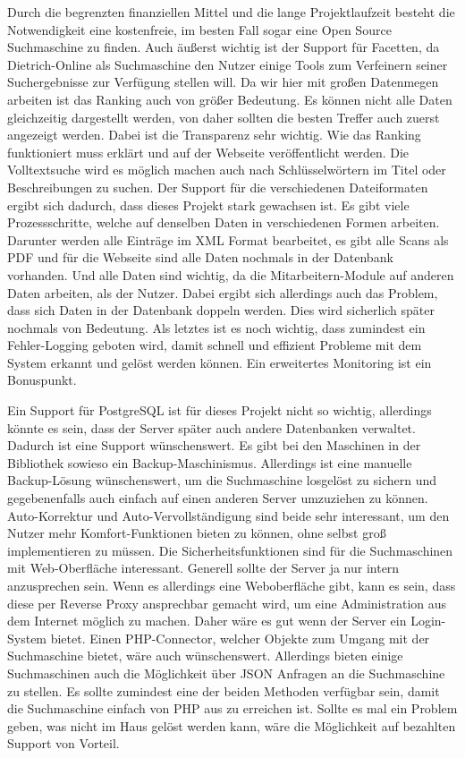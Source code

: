 Durch die begrenzten finanziellen Mittel und die lange Projektlaufzeit besteht die Notwendigkeit eine kostenfreie, im besten Fall sogar eine Open Source Suchmaschine zu finden. Auch äußerst wichtig ist der Support für Facetten, da Dietrich-Online als Suchmaschine den Nutzer einige Tools zum Verfeinern seiner Suchergebnisse zur Verfügung stellen will.
Da wir hier mit großen Datenmegen arbeiten ist das Ranking auch von größer Bedeutung. Es können nicht alle Daten gleichzeitig dargestellt werden, von daher sollten die besten Treffer auch zuerst angezeigt werden. Dabei ist die Transparenz sehr wichtig. Wie das Ranking funktioniert muss erklärt und auf der Webseite veröffentlicht werden.
Die Volltextsuche wird es möglich machen auch nach Schlüsselwörtern im Titel oder Beschreibungen zu suchen.
Der Support für die verschiedenen Dateiformaten ergibt sich dadurch, dass dieses Projekt stark gewachsen ist. Es gibt viele Prozessschritte, welche auf denselben Daten in verschiedenen Formen arbeiten. Darunter werden alle Einträge im XML Format bearbeitet, es gibt alle Scans als PDF und für die Webseite sind alle Daten nochmals in der Datenbank vorhanden. Und alle Daten sind wichtig, da die Mitarbeitern-Module auf anderen Daten arbeiten, als der Nutzer. Dabei ergibt sich allerdings auch das Problem, dass sich Daten in der Datenbank doppeln werden. Dies wird sicherlich später nochmals von Bedeutung.
Als letztes ist es noch wichtig, dass zumindest ein Fehler-Logging geboten wird, damit schnell und effizient Probleme mit dem System erkannt und gelöst werden können. Ein erweitertes Monitoring ist ein Bonuspunkt.

Ein Support für PostgreSQL ist für dieses Projekt nicht so wichtig, allerdings könnte es sein, dass der Server später auch andere Datenbanken verwaltet. Dadurch ist eine Support wünschenswert.
Es gibt bei den Maschinen in der Bibliothek sowieso ein Backup-Maschinismus. Allerdings ist eine manuelle Backup-Lösung wünschenswert, um die Suchmaschine losgelöst zu sichern und gegebenenfalls auch einfach auf einen anderen Server umzuziehen zu können. 
Auto-Korrektur und Auto-Vervollständigung sind beide sehr interessant, um den Nutzer mehr Komfort-Funktionen bieten zu können, ohne selbst groß implementieren zu müssen. 
Die Sicherheitsfunktionen sind für die Suchmaschinen mit Web-Oberfläche interessant. Generell sollte der Server ja nur intern anzusprechen sein. Wenn es allerdings eine Weboberfläche gibt, kann es sein, dass diese per Reverse Proxy ansprechbar gemacht wird, um eine Administration aus dem Internet möglich zu machen. Daher wäre es gut wenn der Server ein Login-System bietet.
Einen PHP-Connector, welcher Objekte zum Umgang mit der Suchmaschine bietet, wäre auch wünschenswert. Allerdings bieten einige Suchmaschinen auch die Möglichkeit über JSON Anfragen an die Suchmaschine zu stellen. Es sollte zumindest eine der beiden Methoden verfügbar sein, damit die Suchmaschine einfach von PHP aus zu erreichen ist.
Sollte es mal ein Problem geben, was nicht im Haus gelöst werden kann, wäre die Möglichkeit auf bezahlten Support von Vorteil.

